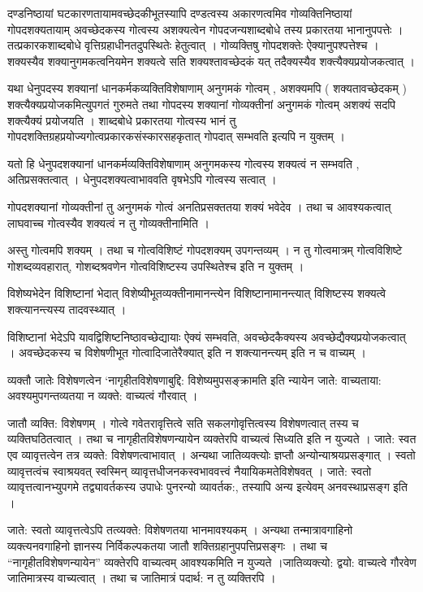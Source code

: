 {दण्डनिष्ठायां घटकारणतायामवच्छेदकीभूतस्यापि दण्डत्वस्य अकारणत्वमिव गोव्यक्तिनिष्ठायां गोपदशक्यतायाम् अवच्छेदकस्य गोत्वस्य अशक्यत्वेन गोपदजन्यशाब्दबोधे तस्य प्रकारतया भानानुपपत्तेः । तत्प्रकारकशाब्दबोधे वृत्तिग्रहाधीनतदुपस्थितेः हेतुत्वात् । गोव्यक्तिषु गोपदशक्तेः ऐक्यानुपश्पत्तेश्च । शक्यस्यैव शक्यानुगमकत्वनियमेन शक्यत्वे सति शक्यश्तावच्छेदकं यत् तदैक्यस्यैव शक्त्यैक्यप्रयोजकत्वात् ।

यथा धेनुपदस्य शक्यानां धानकर्मकव्यक्तिविशेषाणाम् अनुगमकं गोत्वम् , अशक्यमपि ( शक्यतावच्छेदकम् ) शक्त्यैक्यप्रयोजकमित्युपगतं गुरुमते तथा गोपदस्य शक्यानां गोव्यक्तीनां अनुगमकं गोत्वम् अशक्यं सदपि शक्त्यैक्यं प्रयोजयति । शाब्दबोधे प्रकारतया गोत्वस्य भानं तु गोपदशक्तिग्रहप्रयोज्यगोत्वप्रकारकसंस्कारसहकृतात् गोपदात् सम्भवति इत्यपि न युक्तम् ।

यतो हि धेनुपदशक्यानां धानकर्मव्यक्तिविशेषाणाम् अनुगमकस्य गोत्वस्य शक्यत्वं न सम्भवति , अतिप्रसक्तत्वात् । धेनुपदशक्यत्वाभाववति वृषभेऽपि गोत्वस्य सत्वात् ।

गोपदशक्यानां गोव्यक्तीनां तु अनुगमकं गोत्वं अनतिप्रसक्ततया शक्यं भवेदेव । तथा च आवश्यकत्वात् लाघवाच्च गोत्वस्यैव शक्यत्वं न तु गोव्यक्तीनामिति ।

अस्तु गोत्वमपि शक्यम् । तथा च गोत्वविशिष्टं गोपदशक्यम् उपगन्तव्यम् । न तु गोत्वमात्रम् गोत्वविशिष्टे गोशब्दव्यवहारात्, गोशब्दश्रवणेन गोत्वविशिष्टस्य उपस्थितेश्च इति न युक्तम् ।

विशेष्यभेदेन विशिष्टानां भेदात् विशेष्यीभूतव्यक्तीनामानन्त्येन विशिष्टानामानन्त्यात् विशिष्टस्य शक्यत्वे शक्त्यानन्त्यस्य तादवस्थ्यात् ।

विशिष्टानां भेदेऽपि यावद्विशिष्टनिष्ठावच्छेद्यायाः ऐक्यं सम्भवति, अवच्छेदकैक्यस्य अवच्छेद्यैक्यप्रयोजकत्वात् । अवच्छेदकस्य च विशेषणीभूत गोत्वादिजातेरैक्यात् इति न शक्त्यानन्त्यम् इति न च वाच्यम् ।

व्यक्तौ जातेः विशेषणत्वेन ‘नागृहीतविशेषणाबुद्दि: विशेष्यमुपसङ्क्रामति इति न्यायेन जाते: वाच्यताया: अवश्यमुपगन्तव्यतया न व्यक्ते: वाच्यत्वं गौरवात् ।

जातौ व्यक्ति: विशेषणम् । गोत्वे गवेतरावृत्तित्वे सति सकलगोवृत्तित्वस्य विशेषणत्वात् तस्य च व्यक्तिघठितत्वात् । तथा च नागृहीतविशेषणन्यायेन व्यक्तेरपि वाच्यत्वं सिध्यति इति न युज्यते । जाते: स्वत एव व्यावृत्तत्वेन तत्र व्यक्ते: विशेषणत्वाभावात् । अन्यथा जातिव्यक्त्योः ज्ञप्तौ अन्योन्याश्रयप्रसङ्गात् । स्वतो व्यावृत्तत्वंच स्वाश्रयवत् स्वस्मिन् व्यावृत्तधीजनकस्वभाववत्त्वं नैयायिकमतेविशेषवत् । जाते: स्वतो व्यावृत्तत्वानभ्युपगमे तद्व्यावर्तकस्य उपाधेः पुनरन्यो व्यावर्तक:, तस्यापि अन्य इत्येवम् अनवस्थाप्रसङ्ग इति ।

जाते: स्वतो व्यावृत्तत्वेऽपि तत्व्यक्ते: विशेषणतया भानमावश्यकम् । अन्यथा तन्मात्रावगाहिनो व्यक्त्यनवगाहिनो ज्ञानस्य निर्विकल्पकतया जातौ शक्तिग्रहानुपपत्तिप्रसङ्गः । तथा च “नागृहीतविशेषणन्यायेन” व्यक्तेरपि वाच्यत्वम् आवश्यकमिति न युज्यते ।जातिव्यक्त्यो: द्वयो: वाच्यत्वे गौरवेण जातिमात्रस्य वाच्यत्वात् । तथा च जातिमात्रं पदार्थ: न तु व्यक्तिरपि ।

}

